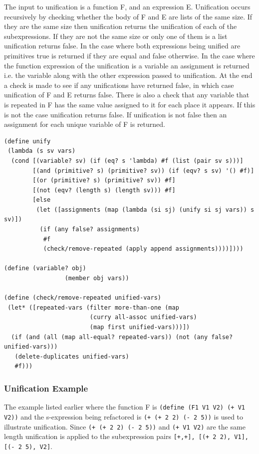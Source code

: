\documentclass[a4paper,10pt]{article}
\begin{document}
The input to unification is a function F, and an expression E.  Unification occurs recursively by checking whether the body of F and E are lists of the same size.  If they are the same size then unification returns the unification of each of the subexpressions.  If they are not the same size or only one of them is a list unification returns false.  In the case where both expressions being unified are primitives true is returned if they are equal and false otherwise.  In the case where the function expression of the unification is a variable an assignment is returned i.e. the variable along with the other expression passed to unification.  At the end a check is made to see if any unifications have returned false, in which case unification of F and E returns false.  There is also a check that any variable that is repeated in F has the same value assigned to it for each place it appears.  If this is not the case unification returns false. If unification is not false then an assignment for each unique variable of F is returned.

\begin{verbatim}
(define unify
 (lambda (s sv vars)
  (cond [(variable? sv) (if (eq? s 'lambda) #f (list (pair sv s)))]
        [(and (primitive? s) (primitive? sv)) (if (eqv? s sv) '() #f)]
        [(or (primitive? s) (primitive? sv)) #f]
        [(not (eqv? (length s) (length sv))) #f]
        [else
         (let ([assignments (map (lambda (si sj) (unify si sj vars)) s sv)])
          (if (any false? assignments)
           #f
           (check/remove-repeated (apply append assignments))))])))

(define (variable? obj)
                 (member obj vars))

(define (check/remove-repeated unified-vars)
 (let* ([repeated-vars (filter more-than-one (map 
                        (curry all-assoc unified-vars) 
                        (map first unified-vars)))])
  (if (and (all (map all-equal? repeated-vars)) (not (any false? unified-vars)))
   (delete-duplicates unified-vars)
   #f)))
\end{verbatim}
\subsubsection{Unification Example}
The example listed earlier where the function F is \texttt{(define (F1 V1 V2) (+ V1 V2))} and the s-expression being refactored is \texttt{(+ (+ 2 2) (- 2 5))} is used to illustrate unification.  Since \texttt{(+ (+ 2 2) (- 2 5))} and \texttt{(+ V1 V2)} are the same length unification is applied to the subexpression pairs \texttt{[+,+], [(+ 2 2), V1], [(- 2 5), V2]}.
\end{document}
